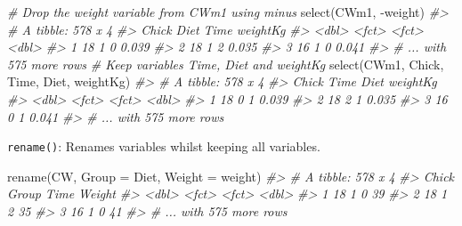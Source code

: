 \documentclass[
  14pt,
]{memoir}
\newenvironment{Shaded}{\begin{snugshade}}{\end{snugshade}}
\newcommand{\AttributeTok}[1]{\textcolor[rgb]{0.77,0.63,0.00}{#1}}
\newcommand{\CommentTok}[1]{\textcolor[rgb]{0.56,0.35,0.01}{\textit{#1}}}
\newcommand{\FunctionTok}[1]{\textcolor[rgb]{0.00,0.00,0.00}{#1}}
\newcommand{\NormalTok}[1]{#1}
\newcommand{\SpecialCharTok}[1]{\textcolor[rgb]{0.00,0.00,0.00}{#1}}
\begin{document}
\begin{Shaded}
\begin{Highlighting}[]
\CommentTok{\# Drop the weight variable from CWm1 using minus}
\FunctionTok{select}\NormalTok{(CWm1, }\SpecialCharTok{{-}}\NormalTok{weight)}
\CommentTok{\#\textgreater{} \# A tibble: 578 x 4}
\CommentTok{\#\textgreater{}   Chick Diet  Time  weightKg}
\CommentTok{\#\textgreater{}   \textless{}dbl\textgreater{} \textless{}fct\textgreater{} \textless{}fct\textgreater{}    \textless{}dbl\textgreater{}}
\CommentTok{\#\textgreater{} 1    18 1     0        0.039}
\CommentTok{\#\textgreater{} 2    18 1     2        0.035}
\CommentTok{\#\textgreater{} 3    16 1     0        0.041}
\CommentTok{\#\textgreater{} \# ... with 575 more rows}
\CommentTok{\# Keep variables Time, Diet and weightKg}
\FunctionTok{select}\NormalTok{(CWm1, Chick, Time, Diet, weightKg)}
\CommentTok{\#\textgreater{} \# A tibble: 578 x 4}
\CommentTok{\#\textgreater{}   Chick Time  Diet  weightKg}
\CommentTok{\#\textgreater{}   \textless{}dbl\textgreater{} \textless{}fct\textgreater{} \textless{}fct\textgreater{}    \textless{}dbl\textgreater{}}
\CommentTok{\#\textgreater{} 1    18 0     1        0.039}
\CommentTok{\#\textgreater{} 2    18 2     1        0.035}
\CommentTok{\#\textgreater{} 3    16 0     1        0.041}
\CommentTok{\#\textgreater{} \# ... with 575 more rows}
\end{Highlighting}
\end{Shaded}

\hfill\break

\texttt{rename()}: Renames variables whilst keeping all variables.

\begin{Shaded}
\begin{Highlighting}[]
\FunctionTok{rename}\NormalTok{(CW, }\AttributeTok{Group =}\NormalTok{ Diet, }\AttributeTok{Weight =}\NormalTok{ weight)}
\CommentTok{\#\textgreater{} \# A tibble: 578 x 4}
\CommentTok{\#\textgreater{}   Chick Group Time  Weight}
\CommentTok{\#\textgreater{}   \textless{}dbl\textgreater{} \textless{}fct\textgreater{} \textless{}fct\textgreater{}  \textless{}dbl\textgreater{}}
\CommentTok{\#\textgreater{} 1    18 1     0         39}
\CommentTok{\#\textgreater{} 2    18 1     2         35}
\CommentTok{\#\textgreater{} 3    16 1     0         41}
\CommentTok{\#\textgreater{} \# ... with 575 more rows}
\end{Highlighting}
\end{Shaded}

\hfill\break
\end{document}
